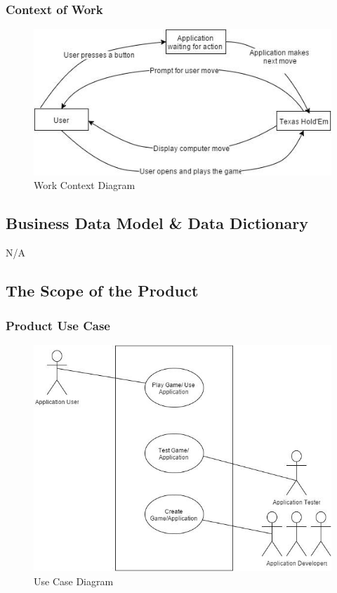\documentclass[12pt]{article}
\begin{document}
	\subsubsection{Context of Work}
		\begin{figure}[h]
		\includegraphics[scale=0.7]{ContexOfWork.jpg}
		\caption{Work Context Diagram}
		\label{fig1: Figure1}
		\end{figure}
	\subsection{Business Data Model \& Data Dictionary}
	N/A
	\subsection{The Scope of the Product}
	\subsubsection{Product Use Case}
		\begin{figure}[h]				
			\includegraphics[scale=0.5]{UseCase.jpg}		
			\caption{Use Case Diagram}		
			\label{fig2: Figure2}		
			\end{figure}
\end{document}
